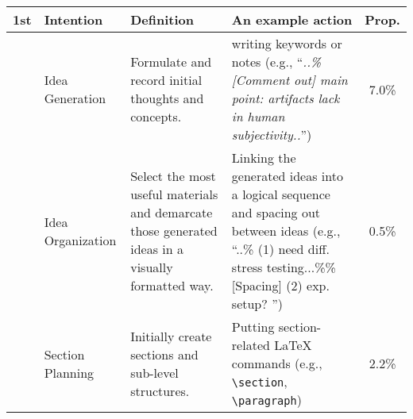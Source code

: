 \begin{table*}[h!]
\centering
\small
\begin{tabular}{@{}p{0.5cm}@{\hskip 1mm}@{}p{1.4cm}p{5.6cm}p{6.9cm}@{\hskip 2mm}c@{}}
\toprule
\textbf{1st} & \textbf{Intention} & \textbf{Definition} & \textbf{An example action} & \textbf{Prop.}\\
\midrule

\parbox[t]{2mm}{}
&  Idea Generation & Formulate and record initial thoughts and concepts. & 
    writing keywords or notes (e.g., ``\textit{..\%[Comment out] main point: artifacts lack in human subjectivity..}'') & 7.0\% \\
\cmidrule(r){2-5}
& {Idea Organization} & Select the most useful materials and demarcate those generated ideas in a visually formatted way.  & Linking the generated ideas into a logical sequence and spacing out between ideas (e.g., ``..\% (1) need diff. stress testing...\%\%[Spacing] (2) exp. setup? '') & 0.5\% \\
\cmidrule(r){2-5}
& {Section Planning} & Initially create sections and sub-level structures. & Putting section-related LaTeX commands (e.g., \texttt{\textbackslash section}, \texttt{\textbackslash paragraph}) & 2.2\% \\
\toprule


\end{tabular}
\end{table*}
